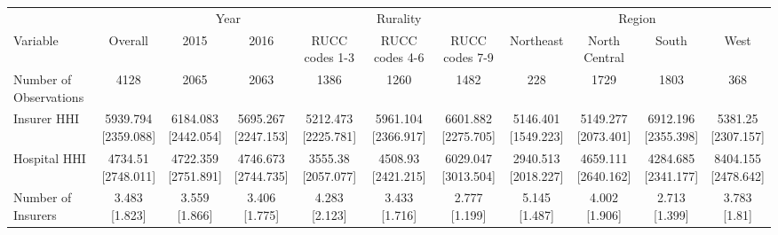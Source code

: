 
\begin{tabular}[t]{lcccccccccc}
\toprule
\multicolumn{1}{c}{} & \multicolumn{1}{c}{} & \multicolumn{2}{c}{Year} & \multicolumn{3}{c}{Rurality} & \multicolumn{4}{c}{Region} \\
\cmidrule(l{3pt}r{3pt}){3-4} \cmidrule(l{3pt}r{3pt}){5-7} \cmidrule(l{3pt}r{3pt}){8-11}
Variable & Overall & 2015 & 2016 & RUCC codes 1-3 & RUCC codes 4-6 & RUCC codes 7-9 & Northeast & North Central & South & West\\
\midrule
Number of Observations & 4128 & 2065 & 2063 & 1386 & 1260 & 1482 & 228 & 1729 & 1803 & 368\\
\addlinespace
Insurer HHI & \makecell[t]{5939.794\\{[}2359.088{]}} & \makecell[t]{6184.083\\{[}2442.054{]}} & \makecell[t]{5695.267\\{[}2247.153{]}} & \makecell[t]{5212.473\\{[}2225.781{]}} & \makecell[t]{5961.104\\{[}2366.917{]}} & \makecell[t]{6601.882\\{[}2275.705{]}} & \makecell[t]{5146.401\\{[}1549.223{]}} & \makecell[t]{5149.277\\{[}2073.401{]}} & \makecell[t]{6912.196\\{[}2355.398{]}} & \makecell[t]{5381.25\\{[}2307.157{]}}\\
\addlinespace
Hospital HHI & \makecell[t]{4734.51\\{[}2748.011{]}} & \makecell[t]{4722.359\\{[}2751.891{]}} & \makecell[t]{4746.673\\{[}2744.735{]}} & \makecell[t]{3555.38\\{[}2057.077{]}} & \makecell[t]{4508.93\\{[}2421.215{]}} & \makecell[t]{6029.047\\{[}3013.504{]}} & \makecell[t]{2940.513\\{[}2018.227{]}} & \makecell[t]{4659.111\\{[}2640.162{]}} & \makecell[t]{4284.685\\{[}2341.177{]}} & \makecell[t]{8404.155\\{[}2478.642{]}}\\
\addlinespace
Number of Insurers & \makecell[t]{3.483\\{[}1.823{]}} & \makecell[t]{3.559\\{[}1.866{]}} & \makecell[t]{3.406\\{[}1.775{]}} & \makecell[t]{4.283\\{[}2.123{]}} & \makecell[t]{3.433\\{[}1.716{]}} & \makecell[t]{2.777\\{[}1.199{]}} & \makecell[t]{5.145\\{[}1.487{]}} & \makecell[t]{4.002\\{[}1.906{]}} & \makecell[t]{2.713\\{[}1.399{]}} & \makecell[t]{3.783\\{[}1.81{]}}\\

\end{tabular}
